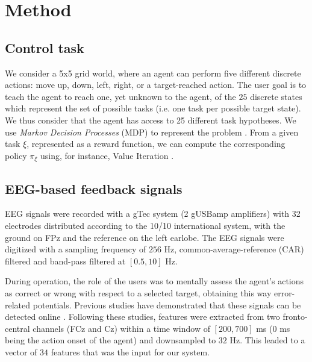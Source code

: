 \section{Method}


\subsection{Control task}
We consider a 5x5 grid world, where an agent can perform five different discrete actions: move up, down, left, right, or a target-reached action. The user goal is to teach the agent to reach one, yet unknown to the agent, of the $25$ discrete states which represent the set of possible tasks (i.e. one task per possible target state). We thus consider that the agent has access to 25 different task hypotheses. We use \textit{Markov Decision Processes} (MDP) to represent the problem \cite{sutton1998reinforcement}. From a given task $\xi$, represented as a reward function, we can compute the corresponding policy $\pi_{\xi}$ using, for instance, Value Iteration \cite{sutton1998reinforcement}. 

\subsection{EEG-based feedback signals}

EEG signals were recorded with a gTec system (2 gUSBamp amplifiers) with 32 electrodes distributed according to the 10/10 international system, with the ground on FPz and the reference on the left earlobe. The EEG signals were digitized with a sampling frequency of $256$ Hz, common-average-reference (CAR) filtered and band-pass filtered at $[0.5, 10]$ Hz. 

During operation, the role of the users was to mentally assess the agent's actions as correct or wrong with respect to a selected target, obtaining this way error-related potentials. Previous studies have demonstrated that these signals can be detected online \cite{FerrezErrores}. Following these studies, features were extracted from two fronto-central channels (FCz and Cz) within a time window of $[200,700]$ ms ($0$ ms being the action onset of the agent) and downsampled to $32$ Hz. This leaded to a vector of $34$ features that was the input for our system.

